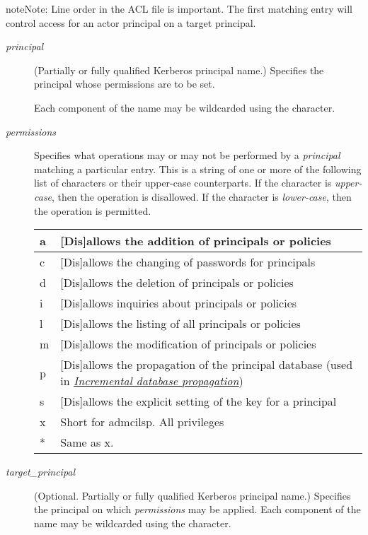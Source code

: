 \documentclass[letterpaper,10pt,english]{sphinxmanual}
\begin{document}
\begin{notice}{note}{Note:}
Line order in the ACL file is important.  The first matching entry
will control access for an actor principal on a target principal.
\end{notice}
\begin{description}
\item[{\emph{principal}}] \leavevmode
(Partially or fully qualified Kerberos principal name.) Specifies
the principal whose permissions are to be set.

Each component of the name may be wildcarded using the \code{*}
character.

\item[{\emph{permissions}}] \leavevmode
Specifies what operations may or may not be performed by a
\emph{principal} matching a particular entry.  This is a string of one or
more of the following list of characters or their upper-case
counterparts.  If the character is \emph{upper-case}, then the operation
is disallowed.  If the character is \emph{lower-case}, then the operation
is permitted.

\begin{tabulary}{\linewidth}{|L|L|}
\hline

a
 & 
{[}Dis{]}allows the addition of principals or policies
\\
\hline
c
 & 
{[}Dis{]}allows the changing of passwords for principals
\\
\hline
d
 & 
{[}Dis{]}allows the deletion of principals or policies
\\
\hline
i
 & 
{[}Dis{]}allows inquiries about principals or policies
\\
\hline
l
 & 
{[}Dis{]}allows the listing of all principals or policies
\\
\hline
m
 & 
{[}Dis{]}allows the modification of principals or policies
\\
\hline
p
 & 
{[}Dis{]}allows the propagation of the principal database (used in {\hyperref[admin/database:incr-db-prop]{\emph{Incremental database propagation}}})
\\
\hline
s
 & 
{[}Dis{]}allows the explicit setting of the key for a principal
\\
\hline
x
 & 
Short for admcilsp. All privileges
\\
\hline
*
 & 
Same as x.
\\
\hline\end{tabulary}


\item[{\emph{target\_principal}}] \leavevmode
(Optional. Partially or fully qualified Kerberos principal name.)
Specifies the principal on which \emph{permissions} may be applied.
Each component of the name may be wildcarded using the \code{*}
character.


\end{description}
\end{document}
